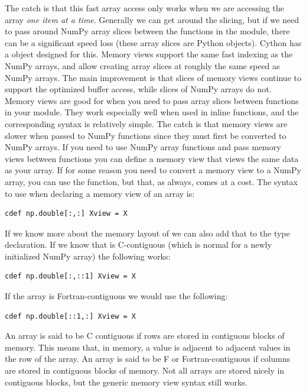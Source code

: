 The catch is that this fast array access only works when we are accessing the array \textit{one item at a time}.
Generally we can get around the slicing, but if we need to pass around NumPy array slices between the functions in the module, there can be a significant speed loss (these array slices are Python objects).
Cython has a  object designed for this.
Memory views support the same fast indexing as the NumPy arrays, and allow creating array slices at roughly the same speed as NumPy arrays.
The main improvement is that slices of memory views continue to support the optimized buffer access, while slices of NumPy arrays do not.
Memory views are good for when you need to pass array slices between functions in your module.
They work especially well when used in inline functions, and the corresponding syntax is relatively simple.
The catch is that memory views are slower when passed to NumPy functions since they must first be converted to NumPy arrays.
If you need to use NumPy array functions and pass memory views between functions you can define a memory view that views the same data as your array.
If for some reason you need to convert a memory view to a NumPy array, you can use the  function, but that, as always, comes at a cost.
The syntax to use when declaring a memory view of an array  is:
\begin{lstlisting}
cdef np.double[:,:] Xview = X
\end{lstlisting}
If we know more about the memory layout of  we can also add that to the type declaration.
If we know that  is C-contiguous (which is normal for a newly initialized NumPy array) the following works:
\begin{lstlisting}
cdef np.double[:,::1] Xview = X
\end{lstlisting}
If the array is Fortran-contiguous we would use the following:
\begin{lstlisting}
cdef np.double[::1,:] Xview = X
\end{lstlisting}
An array is said to be C contiguous if rows are stored in contiguous blocks of memory.
This means that, in memory, a value is adjacent to adjacent values in the row of the array.
An array is said to be F or Fortran-contiguous if columns are stored in contiguous blocks of memory.
Not all arrays are stored nicely in contiguous blocks, but the generic memory view syntax still works.

